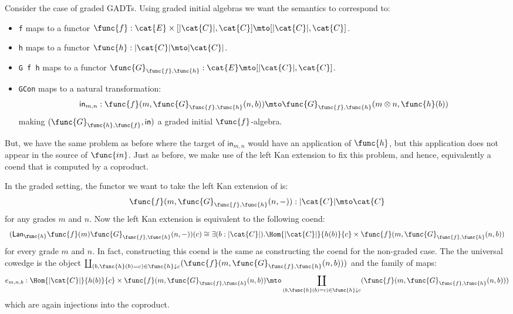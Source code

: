 Consider the case of graded GADTs. Using graded initial algebras we
want the semantics to correspond to:
\begin{itemize}
    \item \verb!f! maps to a functor 
    $\func{f} : \cat{E} \times [|\cat{C}|,\cat{C}] \mto [|\cat{C}|, \cat{C}]$.

    \item \verb!h! maps to a functor 
    $\func{h} : |\cat{C}| \mto |\cat{C}|$. 

    \item \verb!G f h! maps to a functor 
          $\func{G}_{\func{f},\func{h}} : \cat{E} \mto [|\cat{C}|,\cat{C}]$.

    \item \verb!GCon! maps to a natural transformation:
          \[
            \mathsf{in}_{m,n} : \func{f}(m,\func{G}_{\func{f},\func{h}}(n,b)) \mto \func{G}_{\func{f},\func{h}}(m \otimes n,\func{h}(b))
          \]
          making $(\func{G}_{\func{h},\func{f}},\mathsf{in})$ a graded
          initial $\func{f}$-algebra.
\end{itemize}
\noindent But, we have the same problem as before where the target of
$\mathsf{in}_{m,n}$ would have an application of $\func{h}$, but this
application does not appear in the source of $\func{in}$.  Just as
before, we make use of the left Kan extension to fix this problem, and
hence, equivalently a coend that is computed by a coproduct.

In the graded setting, the functor we want to take the left Kan
extension of is:
\[
    \func{f}(m,\func{G}_{\func{f},\func{h}}(n,-)) : |\cat{C}| \mto \cat{C}
\]
for any grades $m$ and $n$. Now the left Kan extension is equivalent to the following coend:
\[
\begin{array}{lll}
    (\Lan{\func{h}}{\func{f}(m)\func{G}_{\func{f},\func{h}}(n,-)})(c) 
    \cong 
    \exists(b : |\cat{C}|).\Hom{|\cat{C}|}{h(b)}{c} \times \func{f}(m,\func{G}_{\func{f},\func{h}}(n,b))
\end{array}
\]
for every grade $m$ and $n$.  In fact, constructing this coend is the
same as constructing the coend for the non-graded case. 
The the universal cowedge is the object $\coprod_{(b,\func{h}(b) = c)
\in \func{h} \downarrow c}(\func{f}(m,\func{G}_{\func{f},\func{h}}(n,b)))$
and the family of maps:
\[
    e_{m,n,b} : \Hom{|\cat{C}|}{h(b)}{c} \times \func{f}(m,\func{G}_{\func{f},\func{h}}(n,b)) \mto 
    \coprod_{(b,\func{h}(b) = c) \in \func{h} \downarrow c}(\func{f}(m,\func{G}_{\func{f},\func{h}}(n,b)))
\]
which are again injections into the coproduct.  

